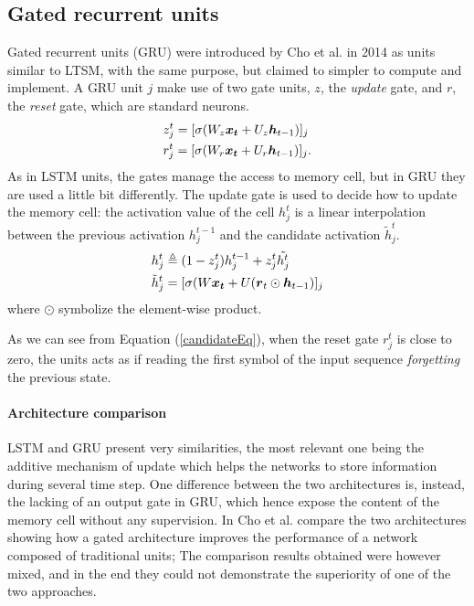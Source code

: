  
\subsection{Gated recurrent units}

Gated recurrent units (GRU) were introduced by Cho et al.\cite{gru} in 2014  as units similar to LTSM, with the same purpose, 
but claimed to simpler to compute and implement. A GRU unit $j$ make use of two gate units, $z$, the 
\textit{update} gate, and $r$, the \textit{reset} gate, which are standard neurons.
\begin{align}
 &z_j^t = [\sigma(W_z\boldsymbol{x_t} + U_z\boldsymbol{h}_{t-1})]_j\\
 &r_j^t = [\sigma(W_r\boldsymbol{x_t} + U_r\boldsymbol{h}_{t-1})]_j.\\
\end{align}
As in LSTM units, the gates manage the access to memory cell, but in GRU they are used a little bit 
differently. The update gate is used to decide how to update the memory cell: the activation value of the cell 
$h_j^{t}$ is a linear interpolation between the previous activation $h_j^{t-1}$ and the candidate activation 
$\tilde{h}_j^t$.
\begin{align}
 &h_j^t \triangleq (1-z_j^t)h_j^{t-1} + z_j^t\tilde{h^t_j}\\
  \label{candidateEq}
 &\tilde{h}_j^t = [\sigma(W\boldsymbol{x_t} + U(\boldsymbol{r}_t \odot \boldsymbol{h}_{t-1})]_j
\end{align}
where $\odot$ symbolize the element-wise product.

As we can see from Equation (\ref{candidateEq}), when the reset gate $r_j^t$ is close to zero, the units acts as if 
reading the first symbol of the input sequence \textit{forgetting} the previous state.

\paragraph{Architecture comparison}
LSTM and GRU present very similarities, the most relevant one being the additive mechanism of update which helps the 
networks to store information during several time step. One difference between the two architectures is, instead, the 
lacking of an output gate in GRU, which hence expose the content of the memory cell without any supervision. In 
\cite{gru_lstm_empirical} Cho et al. compare the two architectures showing how a gated architecture improves the 
performance of a network composed of traditional units; The comparison results obtained were however mixed, and in the 
end they could not demonstrate the superiority of one of the two approaches.


